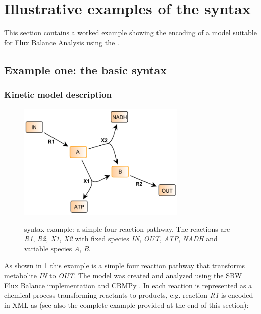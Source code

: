 
\section{Illustrative examples of the \FBC syntax}
\label{examples}

This section contains a worked example showing the encoding of a model suitable for Flux Balance Analysis using the \FBCPackage.

\subsection{Example one: the basic \FBC syntax}
\label{examples1}
\subsubsection{Kinetic model description}
\begin{figure}[h]
  \centering
  \includegraphics[width=8cm]{examples/spec-example1.pdf}\\
  \caption{\FBC syntax example: a simple four reaction pathway. The
  reactions are \textit{R1}, \textit{R2}, \textit{X1}, \textit{X2} with
  fixed species \textit{IN}, \textit{OUT}, \textit{ATP}, \textit{NADH} and
  variable species \textit{A}, \textit{B}.}
  \label{fig:example1}
\end{figure}

As shown in \ref{fig:example1} this example is a simple four reaction
pathway that transforms metabolite \textit{IN} to \textit{OUT}. The
model was created and analyzed using the \textsf{SBW Flux Balance} \FBC
implementation and CBMPy \citep{sbwfba, cbmpy}. In \SBML each reaction is represented
as a chemical process transforming reactants to products, e.g. reaction
\textit{R1} is encoded in XML as (see also the complete example provided
at the end of this section):


